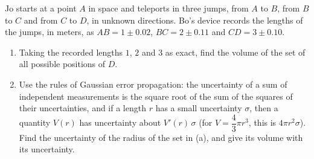 Jo starts at a point $A$ in space and teleports in three jumps, from $A$ to $B$, from $B$ to $C$ and from $C$ to $D$, in unknown directions. Bo's device records the lengths of the jumps, in meters, as $AB=1\pm0.02$, $BC=2\pm0.11$ and $CD=3\pm0.10$.
\begin{enumerate}
\item[(a)] Taking the recorded lengths $1$, $2$ and $3$ as exact, find the volume of the set of all possible positions of $D$.
\item[(b)] Use the rules of Gaussian error propagation: the uncertainty of a sum of independent measurements is the square root of the sum of the squares of their uncertainties, and if a length $r$ has a small uncertainty $\sigma$, then a quantity $V(r)$ has uncertainty about $V'(r)\,\sigma$ (for $V=\dfrac43\pi r^3$, this is $4\pi r^2\sigma$). Find the uncertainty of the radius of the set in (a), and give its volume with its uncertainty.
\end{enumerate}
